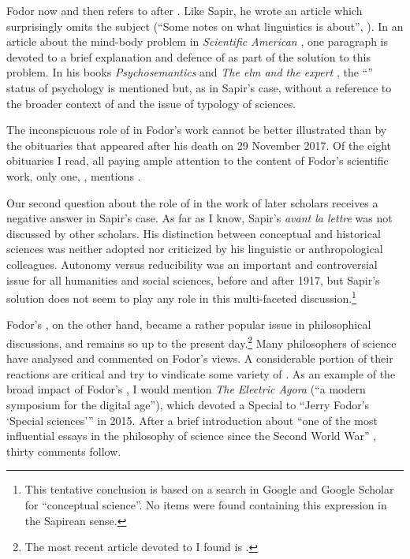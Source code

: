 \documentclass[output=paper]{langscibook}
\begin{document}
Fodor now and then refers to  after \citeyear{Fodor1975}. Like Sapir, he wrote an article which surprisingly omits the subject (``Some notes on what linguistics is about'', \citeyear{Fodor1985}). In an article about the mind-body problem in \emph{Scientific American} \citep{Fodor1981}, one paragraph is devoted to a brief explanation and defence of  as part of the solution to this problem. In his books \emph{Psychosemantics} \citep[5--6]{Fodor1987} and \emph{The elm and the expert} \citep[39]{Fodor1994}, the ``'' status of psychology is mentioned but, as in Sapir's case, without a reference to the broader context of  and the issue of typology of sciences.

The inconspicuous role of  in Fodor's work cannot be better illustrated than by the obituaries that appeared after his death on 29 November 2017. Of the eight obituaries I read, all paying ample attention to the content of Fodor's scientific work, only one, \citet{Rey2017}, mentions .

Our second question about the role of  in the work of later scholars receives a negative answer in Sapir's case. As far as I know, Sapir's  \emph{avant la lettre} was not discussed by other scholars. His distinction between conceptual and historical sciences was neither adopted nor criticized by his linguistic or anthropological colleagues. Autonomy versus reducibility was an important and controversial issue for all humanities and social sciences, before and after 1917, but Sapir's solution does not seem to play any role in this multi-faceted discussion.\footnote{This tentative conclusion is based on a search in Google and Google Scholar for ``conceptual science''. No items were found containing this expression in the Sapirean sense.}

Fodor's , on the other hand, became a rather popular issue in philosophical discussions, and remains so up to the present day.\footnote{The most recent article devoted to  I found is \citet{DiFrisco2017}.} Many philosophers of science have analysed and commented on Fodor's views. A considerable portion of their reactions are critical and try to vindicate some variety of . As an example of the broad impact of Fodor's , I would mention \emph{The Electric Agora} (``a modern symposium for the digital age''), which devoted a Special to ``Jerry Fodor's `Special sciences''' in 2015. After a brief introduction about ``one of the most influential essays in the philosophy of science since the Second World War'' \citep[1--2]{Kaufman2015}, thirty comments follow.
\end{document}
